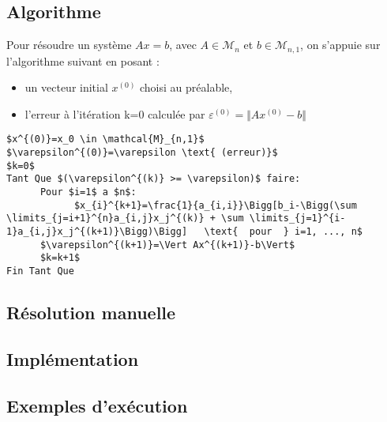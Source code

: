\documentclass{report}
\begin{document}
\subsection{Algorithme}
Pour résoudre un système $Ax=b$, avec $A \in \mathcal{M}_{n}$ et $b\in \mathcal{M}_{n,1}$, on s'appuie sur l'algorithme suivant en posant :
\begin{itemize}
  \item un vecteur initial $x^{(0)}$ choisi au préalable,
  \item l'erreur à l'itération k=0 calculée par $\varepsilon^{(0)}=\Vert Ax^{(0)}-b\Vert$
\end{itemize}\vspace{6pt}
\begin{lstlisting}[mathescape=true, frame=single, basicstyle=\linespread{1.5}\fontsize{8}{10}\selectfont]
$x^{(0)}=x_0 \in \mathcal{M}_{n,1}$
$\varepsilon^{(0)}=\varepsilon \text{ (erreur)}$
$k=0$
Tant Que $(\varepsilon^{(k)} >= \varepsilon)$ faire:
      Pour $i=1$ a $n$:
            $x_{i}^{k+1}=\frac{1}{a_{i,i}}\Bigg[b_i-\Bigg(\sum \limits_{j=i+1}^{n}a_{i,j}x_j^{(k)} + \sum \limits_{j=1}^{i-1}a_{i,j}x_j^{(k+1)}\Bigg)\Bigg]   \text{  pour  } i=1, ..., n$
      $\varepsilon^{(k+1)}=\Vert Ax^{(k+1)}-b\Vert$
      $k=k+1$
Fin Tant Que
\end{lstlisting}
\subsection{Résolution manuelle}
\subsection{Implémentation}
\subsection{Exemples d'exécution}
\end{document}
